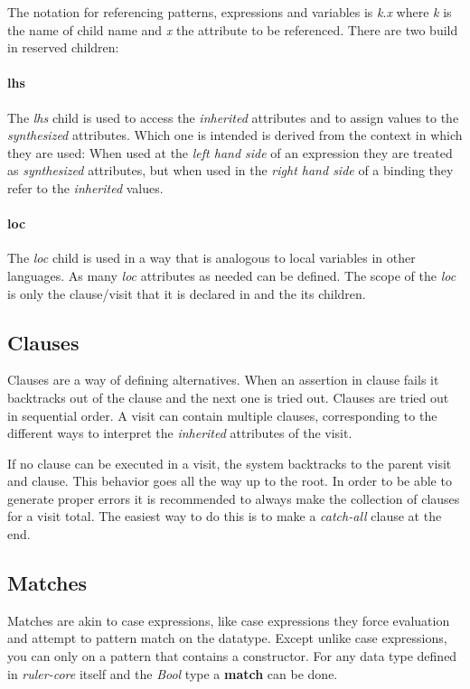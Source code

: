 \documentclass[twoside, titlepage, openright, a4paper]{book}
\newcommand{\rcore}{\emph{ruler-core }}
\begin{document}
The notation for referencing patterns, expressions and variables is \emph{k}.\emph{x} where \emph{k} is the name of child name and \emph{x} the attribute to be referenced. There are two build in reserved children:

\paragraph{lhs}
The \emph{lhs} child is used to access the \emph{inherited} attributes and to assign values to the \emph{synthesized} attributes. Which one is intended is derived from the context in which they are used: When used at the \emph{left hand side} of an expression they are treated as \emph{synthesized} attributes, but when used in the \emph{right hand side} of a binding they refer to the \emph{inherited} values.
 
\paragraph{loc}
The \emph{loc} child is used in a way that is analogous to local variables in other languages. As many \emph{loc} attributes as needed can be defined. The scope of the \emph{loc} is only the clause/visit that it is declared in and the its children.

\subsection{Clauses}
Clauses are a way of defining alternatives. When an assertion in clause fails  it backtracks out of the clause and the next one is tried out. Clauses are tried out in sequential order. A visit can contain multiple clauses, corresponding to the different ways to interpret the \emph{inherited} attributes of the visit.

If no clause can be executed in a visit, the system backtracks to the parent visit and clause. This behavior goes all the way up to the root. In order to be able to generate proper errors it is recommended to always make the collection of clauses for a visit total. The easiest way to do this is to make a \emph{catch-all} clause at the end.

\subsection{Matches}
Matches are akin to case expressions, like case expressions they force evaluation and attempt to pattern match on the datatype. Except unlike case expressions, you can only on a pattern that contains a constructor. For any data type defined in \rcore itself and the \emph{Bool} type a \textbf{match} can be done.
\end{document}

